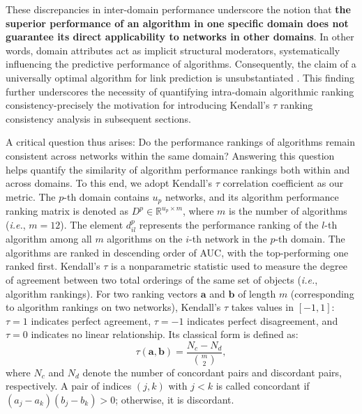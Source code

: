 \documentclass{article}
\begin{document}
These discrepancies in inter-domain performance underscore the notion that \textbf{ the superior performance of an algorithm in one specific domain does not guarantee its direct applicability to networks in other domains}. In other words, domain attributes act as implicit structural moderators, systematically influencing the predictive performance of algorithms. Consequently, the claim of a universally optimal algorithm for link prediction is unsubstantiated \cite{ghasemian2019}. This finding further underscores the necessity of quantifying intra-domain algorithmic ranking consistency-precisely the motivation for introducing Kendall's $\tau$ ranking consistency analysis in subsequent sections.
	
 A critical question thus arises: Do the performance rankings of algorithms remain consistent across networks within the same domain? Answering this question helps quantify the similarity of algorithm performance rankings both within and across domains. To this end, we adopt Kendall's $\tau$ correlation coefficient \cite{kendall1938} as our metric. The $p$-th domain contains $u_p$ networks, and its algorithm performance ranking matrix is denoted as $D^p \in \mathbb{R}^{u_p \times m}$, where $m$ is the number of algorithms (\textit{i.e.}, $m=12$). The element $d_{il}^p$ represents the performance ranking of the $l$-th algorithm among all $m$ algorithms on the $i$-th network in the $p$-th domain. The algorithms are ranked in descending order of AUC, with the top-performing one ranked first. Kendall's $\tau$ is a nonparametric statistic used to measure the degree of agreement between two total orderings of the same set of objects (\textit{i.e.}, algorithm rankings). For two ranking vectors $\bm{a}$ and $\bm{b}$ of length $m$ (corresponding to algorithm rankings on two networks), Kendall's $\tau$ takes values in $[-1,1]$: $\tau = 1$ indicates perfect agreement, $\tau = -1$ indicates perfect disagreement, and $\tau = 0$ indicates no linear relationship. Its classical form is defined as: $$\tau(\bm{a}, \bm{b}) = \frac{N_c - N_d}{\binom{m}{2}},$$ where $N_c$ and $N_d$ denote the number of concordant pairs and discordant pairs, respectively. A pair of indices $(j, k)$ with $j<k$ is called concordant if $(a_j - a_k)(b_j - b_k) > 0$; otherwise, it is discordant.
	
\end{document}
